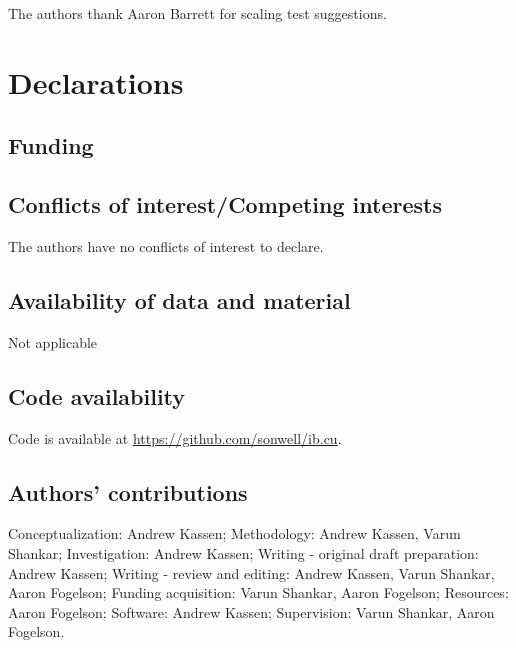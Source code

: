 \begin{acknowledgements}
The authors thank Aaron Barrett for scaling test suggestions.
\end{acknowledgements}

{}

\section*{Declarations}
\subsection*{Funding}
\subsection*{Conflicts of interest/Competing interests}
The authors have no conflicts of interest to declare.
\subsection*{Availability of data and material} Not applicable
\subsection*{Code availability} Code is available at \url{https://github.com/sonwell/ib.cu}.
\subsection*{Authors' contributions}
Conceptualization: Andrew Kassen;
Methodology: Andrew Kassen, Varun Shankar;
Investigation: Andrew Kassen;
Writing - original draft preparation: Andrew Kassen;
Writing - review and editing: Andrew Kassen, Varun Shankar, Aaron Fogelson;
Funding acquisition: Varun Shankar, Aaron Fogelson;
Resources: Aaron Fogelson;
Software: Andrew Kassen;
Supervision: Varun Shankar, Aaron Fogelson.


